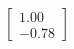 \documentclass[preview]{standalone}
\begin{document}
\begin{align*}
\begin{bmatrix} 1.00 \\ -0.78 \end{bmatrix}
\end{align*}
\end{document}
